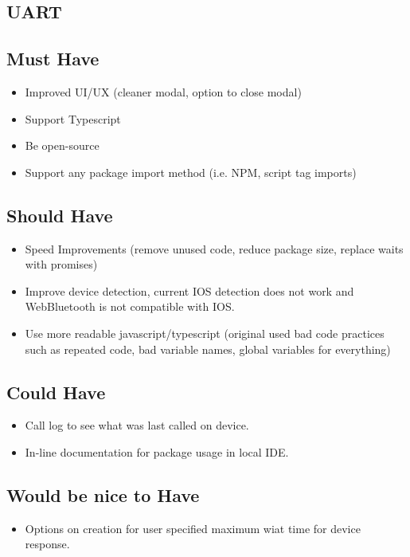 \documentclass{l4proj}
\begin{document}
\begin{appendices}

\section{UART}
\subsection{Must Have}
\begin{itemize}
    \item Improved UI/UX (cleaner modal, option to close modal)
    \item Support Typescript
    \item Be open-source
    \item Support any package import method (i.e. NPM, script tag imports)
\end{itemize}
\subsection{Should Have}
\begin{itemize}
    \item Speed Improvements (remove unused code, reduce package size, replace waits with promises)
    \item Improve device detection, current IOS detection does not work and WebBluetooth is not compatible with IOS.
    \item Use more readable javascript/typescript (original used bad code practices such as repeated code, bad variable names, global variables for everything)
\end{itemize}
\subsection{Could Have}
\begin{itemize}
    \item Call log to see what was last called on device.
    \item In-line documentation for package usage in local IDE.
\end{itemize}
\subsection{Would be nice to Have}
\begin{itemize}
    \item Options on creation for user specified maximum wiat time for device response.
\end{itemize}


\end{appendices}
\end{document}
